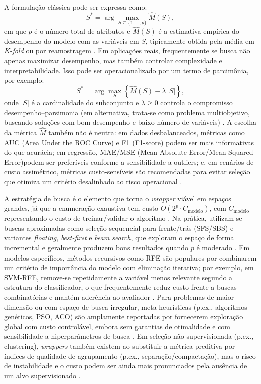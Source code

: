 A formulação clássica pode ser expressa como:
\[
S^\ast=\arg\max_{S\subseteq\{1,\dots,p\}} \widehat{M}(S),
\]
em que \(p\) é o número total de atributos e \(\widehat{M}(S)\) é a estimativa empírica do desempenho do modelo com as variáveis em \(S\), tipicamente obtida pela média em \(K\)-\textit{fold} ou por reamostragem \cite{KOHAVI1997273,Dhal2022,Theng2024}. Em aplicações reais, frequentemente se busca não apenas maximizar desempenho, mas também controlar complexidade e interpretabilidade. Isso pode ser operacionalizado por um termo de parcimônia, por exemplo:
\[
S^\ast=\arg\max_{S}\left\{\widehat{M}(S)-\lambda\,|S|\right\},
\]
onde \(|S|\) é a cardinalidade do subconjunto e \(\lambda\ge 0\) controla o compromisso desempenho--parsimonia (em alternativa, trata-se como problema multiobjetivo, buscando soluções com bom desempenho e baixo número de variáveis) \cite{Theng2024,Bouchlaghem2022}. A escolha da métrica \(\widehat{M}\) também não é neutra: em dados desbalanceados, métricas como AUC (Area Under the ROC Curve) e F1 (F1-score) podem ser mais informativas do que acurácia; em regressão, MAE/MSE (Mean Absolute Error/Mean Squared Error)podem ser preferíveis conforme a sensibilidade a outliers; e, em cenários de custo assimétrico, métricas custo-sensíveis são recomendadas para evitar seleção que otimiza um critério desalinhado ao risco operacional \cite{Dhal2022,Theng2024}.

A estratégia de busca é o elemento que torna o \textit{wrapper} viável em espaços grandes, já que a enumeração exaustiva tem custo \(O(2^p\cdot C_{\text{modelo}})\), com \(C_{\text{modelo}}\) representando o custo de treinar/validar o algoritmo \cite{KOHAVI1997273,bolon2018scalability,Emmoh2024}. Na prática, utilizam-se buscas aproximadas como seleção sequencial para frente/trás (SFS/SBS) e variantes \textit{floating}, \textit{best-first} e \textit{beam search}, que exploram o espaço de forma incremental e geralmente produzem bons resultados quando \(p\) é moderado \cite{jovic2015review,Theng2024}. Em modelos específicos, métodos recursivos como RFE são populares por combinarem um critério de importância do modelo com eliminação iterativa; por exemplo, em SVM-RFE, remove-se repetidamente a variável menos relevante segundo a estrutura do classificador, o que frequentemente reduz custo frente a buscas combinatórias e mantém aderência ao avaliador \cite{Theng2024,Bouchlaghem2022}. Para problemas de maior dimensão ou com espaço de busca irregular, meta-heurísticas (p.ex., algoritmos genéticos, PSO, ACO) são amplamente reportadas por fornecerem exploração global com custo controlável, embora sem garantias de otimalidade e com sensibilidade a hiperparâmetros de busca \cite{EBRAHIMIWARKIANI2025129372}. Em seleção não supervisionada (p.ex., clustering), \textit{wrappers} também existem ao substituir a métrica preditiva por índices de qualidade de agrupamento (p.ex., separação/compactação), mas o risco de instabilidade e o custo podem ser ainda mais pronunciados pela ausência de um alvo supervisionado \cite{SolorioFernandez2020}.

